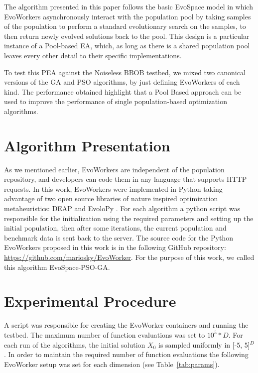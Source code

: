 \documentclass[sigconf]{acmart}
\begin{document}
The algorithm presented in this paper follows the basic  EvoSpace model
\cite{GValdez2015} in which EvoWorkers  asynchronously interact with the
population pool by taking samples of the population to perform a standard
evolutionary search on the samples, to then return newly evolved solutions back
to the pool. This design is a particular instance of a Pool-based EA, which, as
long as there is a shared population pool leaves every other detail to their
specific implementations.


To test this PEA against the Noiseless BBOB testbed, 
we mixed two canonical versions of the GA and PSO algorithms, 
by just defining EvoWorkers of each kind. The performance 
obtained highlight 
that a Pool Based approach can be used to improve the performance 
of single population-based optimization algorithms.

\section{Algorithm Presentation}

As we mentioned earlier, EvoWorkers are independent of 
the population repository, and developers can code them 
in any language that supports HTTP requests. In this work,  
EvoWorkers were implemented in Python taking advantage of 
two open source libraries of nature inspired optimization 
metaheuristics:  DEAP \cite{fortin2012deap} and EvoloPy 
\cite{faris2016evolopy}. For each algorithm a 
python script was responsible for the initialization using 
the required parameters and setting up the initial population, 
then after some iterations, the current population and 
benchmark data is sent back to the server. The source code 
for the Python EvoWorkers proposed in this work is in 
the following GitHub repository: \url{https://github.com/mariosky/EvoWorker}.
For the purpose of this work, we called this algorithm EvoSpace-PSO-GA.   


% 
\section{Experimental Procedure} 
A script was responsible for creating the
EvoWorker  containers and running the testbed. The maximum number of  function
evaluations was set to $10^5*D$. For each run  of the algorithms, the initial
solution $X_0$ is sampled uniformly in [-5, 5]$^D$. In order to maintain the
required number of function  evaluations the following EvoWorker setup was set
for each dimension (see Table~\ref{tab:params}).
\end{document}
